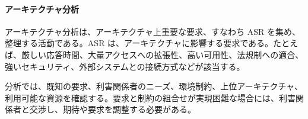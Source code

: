 \paragraph{アーキテクチャ分析}
アーキテクチャ分析は、アーキテクチャ上重要な要求、すなわち ASR を集め、整理する活動である。ASR は、アーキテクチャに影響する要求である。たとえば、厳しい応答時間、大量アクセスへの拡張性、高い可用性、法規制への適合、強いセキュリティ、外部システムとの接続方式などが該当する。

分析では、既知の要求、利害関係者のニーズ、環境制約、上位アーキテクチャ、利用可能な資源を確認する。要求と制約の組合せが実現困難な場合には、利害関係者と交渉し、期待や要求を調整する必要がある。
